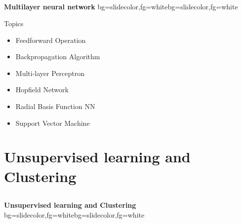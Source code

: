 \subsection{}
\begin{frame}{}
\begin{variableblock}{\centering \Large \textbf{\vspace{4pt}\newline Multilayer neural network \vspace{4pt}}}{bg=slidecolor,fg=white}{bg=slidecolor,fg=white}
\end{variableblock}
\end{frame}

\begin{frame}{Topics}
\begin{itemize}
\item Feedforward Operation
\item Backpropagation Algorithm
\item Multi-layer Perceptron
\item Hopfield Network
\item Radial Basis Function NN
\item Support Vector Machine
\end{itemize}
\end{frame}

\section{Unsupervised learning and Clustering}
\subsection{}
\begin{frame}{}
\begin{variableblock}{\centering \Large \textbf{\vspace{4pt}\newline Unsupervised learning and Clustering \vspace{4pt}}}{bg=slidecolor,fg=white}{bg=slidecolor,fg=white}
\end{variableblock}
\end{frame}

